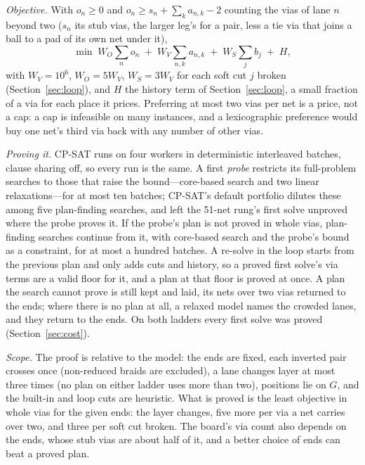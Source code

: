 \documentclass[journal]{IEEEtran}
\begin{document}
\emph{Objective.} With $o_n\ge 0$ and $o_n\ge s_n+\sum_k a_{n,k}-2$ counting the vias of lane $n$ beyond two ($s_n$ its stub vias, the larger leg's for a pair, less a tie via that joins a ball to a pad of its own net under it),
\begin{equation}
\min\; W_O\sum_n o_n \;+\; W_V\sum_{n,k} a_{n,k} \;+\; W_S\sum_j b_j \;+\; H ,
\end{equation}
with $W_V=10^6$, $W_O=5W_V$, $W_S=3W_V$ for each soft cut $j$ broken (Section~\ref{sec:loop}), and $H$ the history term of Section~\ref{sec:loop}, a small fraction of a via for each place it prices. Preferring at most two vias per net is a price, not a cap: a cap is infeasible on many instances, and a lexicographic preference would buy one net's third via back with any number of other vias.

\emph{Proving it.} CP-SAT runs on four workers in deterministic interleaved batches, clause sharing off, so every run is the same. A first \emph{probe} restricts its full-problem searches to those that raise the bound---core-based search and two linear relaxations---for at most ten batches; CP-SAT's default portfolio dilutes these among five plan-finding searches, and left the 51-net rung's first solve unproved where the probe proves it. If the probe's plan is not proved in whole vias, plan-finding searches continue from it, with core-based search and the probe's bound as a constraint, for at most a hundred batches. A re-solve in the loop starts from the previous plan and only adds cuts and history, so a proved first solve's via terms are a valid floor for it, and a plan at that floor is proved at once. A plan the search cannot prove is still kept and laid, its nets over two vias returned to the ends; where there is no plan at all, a relaxed model names the crowded lanes, and they return to the ends. On both ladders every first solve was proved (Section~\ref{sec:cost}).

\emph{Scope.} The proof is relative to the model: the ends are fixed, each inverted pair crosses once (non-reduced braids are excluded), a lane changes layer at most three times (no plan on either ladder uses more than two), positions lie on $G$, and the built-in and loop cuts are heuristic. What is proved is the least objective in whole vias for the given ends: the layer changes, five more per via a net carries over two, and three per soft cut broken. The board's via count also depends on the ends, whose stub vias are about half of it, and a better choice of ends can beat a proved plan.
\end{document}
